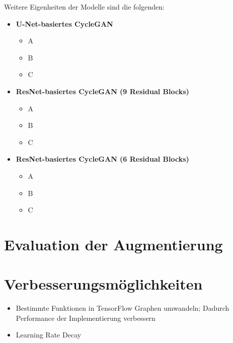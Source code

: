 Weitere Eigenheiten der Modelle sind die folgenden:
\begin{itemize}
	\item \textbf{U-Net-basiertes \ac{CycleGAN}}
		\begin{itemize}
			\item A
			\item B
			\item C
		\end{itemize}
	\item \textbf{ResNet-basiertes \ac{CycleGAN} (9 Residual Blocks)}
		\begin{itemize}
			\item A
			\item B
			\item C
		\end{itemize}
	\item \textbf{ResNet-basiertes \ac{CycleGAN} (6 Residual Blocks)}
		\begin{itemize}
			\item A
			\item B
			\item C
		\end{itemize}
\end{itemize}

\section{Evaluation der Augmentierung}

\section{Verbesserungsmöglichkeiten}
\begin{itemize}
   \item Bestimmte Funktionen in TensorFlow Graphen umwandeln; Dadurch Performance der Implementierung verbessern
   \item Learning Rate Decay
\end{itemize}